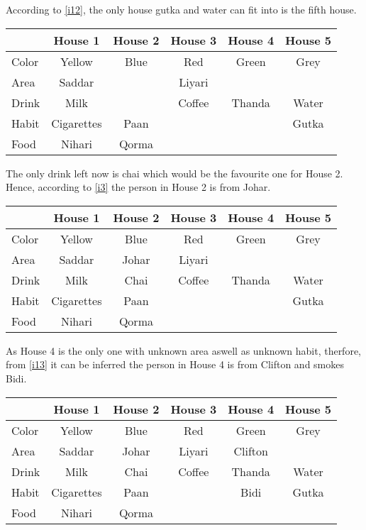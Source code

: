 \documentclass[a4paper]{exam}
\newcommand\cb{\color{blue}}
\begin{document}
\begin{questions}
\begin{solution}
    According to \ref{i12}, the only house gutka and water can fit into is the fifth house.\\
    \begin{tabular}{l||*5{c|}}
      & \textbf{House 1} & \textbf{\cb House 2} & \textbf{House 3} & \textbf{House 4} & \textbf{House 5} \\
      \hline\hline
      Color & Yellow & Blue & Red & Green & Grey \\\hline
      Area & Saddar & & Liyari & & \\\hline
      Drink & Milk & & Coffee & Thanda & Water \\\hline
      Habit & Cigarettes & Paan & & & Gutka \\\hline
      Food & Nihari & Qorma & & & \\\hline
    \end{tabular}
  
    The only drink left now is chai which would be the favourite one for House 2. Hence, according to \ref{i3} the person in House 2 is from Johar.\\
    \begin{tabular}{l||*5{c|}}
      & \textbf{House 1} & \textbf{\cb House 2} & \textbf{House 3} & \textbf{House 4} & \textbf{House 5} \\
      \hline\hline
      Color & Yellow & Blue & Red & Green & Grey \\\hline
      Area & Saddar & Johar & Liyari & & \\\hline
      Drink & Milk & Chai & Coffee & Thanda & Water \\\hline
      Habit & Cigarettes & Paan & & & Gutka \\\hline
      Food & Nihari & Qorma & & & \\\hline
    \end{tabular}

    As House 4 is the only one with unknown area aswell as unknown habit, therfore, from \ref{i13} it can be inferred the person in House 4 is from Clifton and smokes Bidi.\\
    \begin{tabular}{l||*5{c|}}
      & \textbf{House 1} & \textbf{\cb House 2} & \textbf{House 3} & \textbf{House 4} & \textbf{House 5} \\
      \hline\hline
      Color & Yellow & Blue & Red & Green & Grey \\\hline
      Area & Saddar & Johar & Liyari & Clifton & \\\hline
      Drink & Milk & Chai & Coffee & Thanda & Water \\\hline
      Habit & Cigarettes & Paan & & Bidi & Gutka \\\hline
      Food & Nihari & Qorma & & & \\\hline
    \end{tabular}


\end{solution}
\end{questions}
\end{document}
